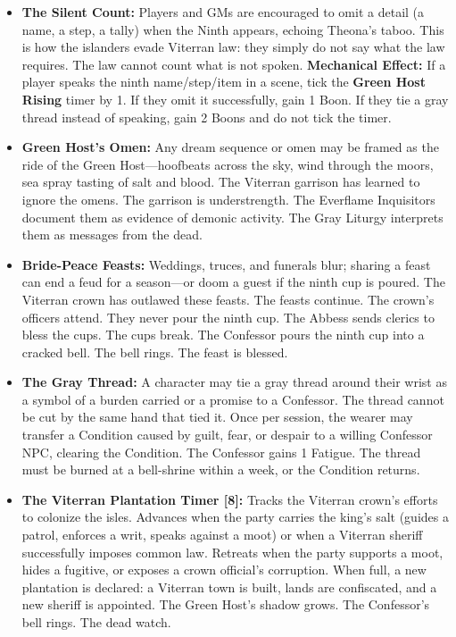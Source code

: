 \begin{itemize}
\item \textbf{The Silent Count:} Players and GMs are encouraged to omit a detail (a name, a step, a tally) when the Ninth appears, echoing Theona's taboo. This is how the islanders evade Viterran law: they simply do not say what the law requires. The law cannot count what is not spoken. \textbf{Mechanical Effect:} If a player speaks the ninth name/step/item in a scene, tick the \textbf{Green Host Rising} timer by 1. If they omit it successfully, gain 1 Boon. If they tie a gray thread instead of speaking, gain 2 Boons and do not tick the timer.
\item \textbf{Green Host's Omen:} Any dream sequence or omen may be framed as the ride of the Green Host---hoofbeats across the sky, wind through the moors, sea spray tasting of salt and blood. The Viterran garrison has learned to ignore the omens. The garrison is understrength. The Everflame Inquisitors document them as evidence of demonic activity. The Gray Liturgy interprets them as messages from the dead.
\item \textbf{Bride-Peace Feasts:} Weddings, truces, and funerals blur; sharing a feast can end a feud for a season---or doom a guest if the ninth cup is poured. The Viterran crown has outlawed these feasts. The feasts continue. The crown's officers attend. They never pour the ninth cup. The Abbess sends clerics to bless the cups. The cups break. The Confessor pours the ninth cup into a cracked bell. The bell rings. The feast is blessed.
\item \textbf{The Gray Thread:} A character may tie a gray thread around their wrist as a symbol of a burden carried or a promise to a Confessor. The thread cannot be cut by the same hand that tied it. Once per session, the wearer may transfer a Condition caused by guilt, fear, or despair to a willing Confessor NPC, clearing the Condition. The Confessor gains 1 Fatigue. The thread must be burned at a bell-shrine within a week, or the Condition returns.
\item \textbf{The Viterran Plantation Timer [8]:} Tracks the Viterran crown's efforts to colonize the isles. Advances when the party carries the king's salt (guides a patrol, enforces a writ, speaks against a moot) or when a Viterran sheriff successfully imposes common law. Retreats when the party supports a moot, hides a fugitive, or exposes a crown official's corruption. When full, a new plantation is declared: a Viterran town is built, lands are confiscated, and a new sheriff is appointed. The Green Host's shadow grows. The Confessor's bell rings. The dead watch.

\end{itemize}
